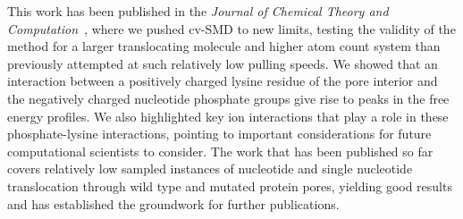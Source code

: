 \documentclass[a4paper,10pt]{article}
\begin{document}
This work has been published in the {\em Journal of Chemical Theory and Computation}~\cite{jctc_cover}, where we pushed cv-SMD to new limits, testing the validity of the method for a larger translocating molecule and higher atom count system than previously attempted at such relatively low pulling speeds. We showed that an interaction between a positively charged lysine residue of the pore interior and the negatively charged nucleotide phosphate groups give rise to peaks in the free energy profiles. We also highlighted key ion interactions that play a role in these phosphate-lysine interactions, pointing to important considerations for future computational scientists to consider. The work that has been published so far covers relatively low sampled instances of nucleotide and single nucleotide translocation through wild type and mutated protein pores, yielding good results and has established the groundwork for further publications.
\end{document}
